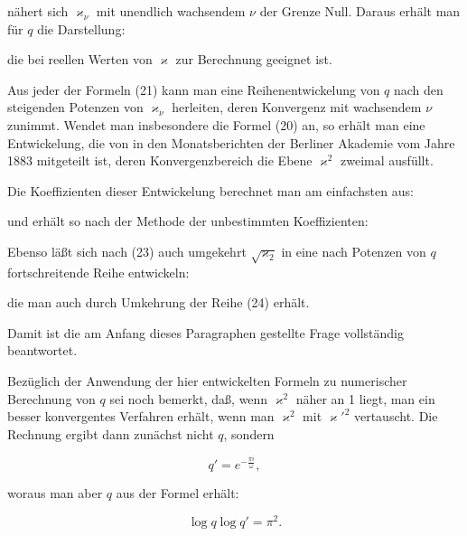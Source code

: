 n\"ahert sich $\varkappa_\nu$ mit unendlich wachsendem $\nu$ der Grenze Null. Daraus erh\"alt man f\"ur $q$ die Darstellung:


die bei reellen Werten von $\varkappa$ zur Berechnung geeignet ist.

Aus jeder der Formeln (21) kann man eine Reihenentwickelung von $q$ nach den steigenden Potenzen von $\varkappa_\nu$ herleiten, deren Konvergenz mit wachsendem $\nu$ zunimmt. Wendet man insbesondere die Formel (20) an, so erh\"alt man eine Entwickelung, die von  in den Monatsberichten der Berliner Akademie vom Jahre 1883 mitgeteilt ist, deren Konvergenzbereich die Ebene $\varkappa^2$ zweimal ausf\"ullt.

Die Koeffizienten dieser Entwickelung berechnet man am einfachsten aus:


und erh\"alt so nach der Methode der unbestimmten Koeffizienten:


Ebenso l\"a\ss{}t sich nach (23) auch umgekehrt $\sqrt{\varkappa_2}$ in eine nach Potenzen von $q$ fortschreitende Reihe entwickeln:


die man auch durch Umkehrung der Reihe (24) erh\"alt.

Damit ist die am Anfang dieses Paragraphen gestellte Frage vollst\"andig beantwortet.

Bez\"uglich der Anwendung der hier entwickelten Formeln zu numerischer Berechnung von $q$ sei noch bemerkt, da\ss{}, wenn $\varkappa^2$ n\"aher an 1 liegt, man ein besser konvergentes Verfahren erh\"alt, wenn man $\varkappa^2$ mit $\varkappa'^2$ vertauscht. Die Rechnung ergibt dann zun\"achst nicht $q$, sondern

\[
q' = e^{-\frac{\pi i}{\omega}},
\]

woraus man aber $q$ aus der Formel erh\"alt:

\[
\log q \log q' = \pi^2.
\]
